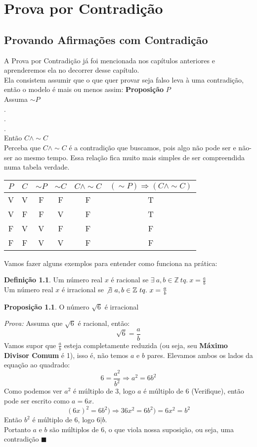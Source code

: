 \documentclass[a4paper,11pt,oneside]{book}
\theoremstyle{definition}
\theoremstyle{break}
\newtheorem{definition}{Definição}[section]
\newtheorem{proposition}{Proposição}
\begin{document}
\chapter{Prova por Contradição}
\section{Provando Afirmações com Contradição}
A Prova por Contradição já foi mencionada nos capítulos anteriores e aprenderemos ela no decorrer desse capítulo.\\
Ela consistem assumir que o que quer provar seja falso leva à uma contradição, então o modelo é mais ou menos assim:
\textbf{Proposição }$P$\\
Assuma $\sim P$ \\
. \\
. \\
. \\
Então $C \land \sim C$
\\
Perceba que $C \land \sim C$ é a contradição que buscamos, pois algo não pode ser e não-ser ao mesmo tempo. Essa relação fica muito mais simples de ser compreendida numa tabela verdade. \\
\begin{center}
\begin{tabular}{|c | c || c | c | c || c |} \hline
$P$  & $C$ & $\sim P$ & $\sim C$ & $C \land \sim C$ & $(\sim P) \Rightarrow (C \land \sim C)$  \\ \hline 
V    &  V  &  F       &  F       &   F              &         T   \\
V    &  F  & F        &  V       &  F               &         T \\
F    &   V & V        &F         &  F               &       F \\
F    & F   & V        & V        & F                & F    \\ \hline 
\end{tabular}
\end{center}
Vamos fazer alguns exemplos para entender como funciona na prática:

\begin{definition}
Um número real $x$ é racional se $\exists \ a,b \in \mathbb{Z} \ tq. \ x = \frac{a}{b}$\\
Um número real $x$ é irracional se $\not\exists \ a,b \in \mathbb{Z} \ tq. \ x = \frac{a}{b}$
\end{definition}
\begin{proposition}
O número $\sqrt{6}$ é irracional
\end{proposition}
\textit{Prova:} Assuma que $\sqrt{6}$ é racional, então: 
$$\sqrt{6} = \frac{a}{b}$$
Vamos supor que $\frac{a}{b}$ esteja completamente reduzida (ou seja, seu \textbf{Máximo Divisor Comum} é 1), isso é, não temos $a$ e $b$ pares. Elevamos ambos os lados da equação ao quadrado:
$$6 = \frac{a^2}{b^2} \Rightarrow a^2 = 6b^2$$
Como podemos ver $a^2$ é múltiplo de 3, logo $a$ é múltiplo de 6 (Verifique), então pode ser escrito como $a = 6x$. \\
$$(6x)^2 = 6b^2) \Rightarrow 36x^2 = 6b^2) = 6x^2 = b^2$$
Então $b^2$ é múltiplo de $6$, logo $6 | b$. \\
Portanto $a$ e $b$ são múltiplos de $6$, o que viola nossa suposição, ou seja, uma contradição $\blacksquare$
\end{document}
